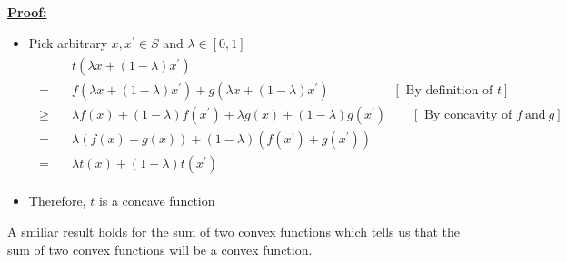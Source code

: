 \documentclass[12pt,a4paper]{article}
\begin{document}
 \underline{\textbf{Proof:}} 
 \begin{itemize}
    \item Pick arbitrary \(x, x^{\prime} \in S\) and \(\lambda \in[0,1]\)
    \begin{align*}
    \begin{array}{ll} 
    & t\left(\lambda x+(1-\lambda) x^{\prime}\right) \\
    =\quad & f\left(\lambda x+(1-\lambda) x^{\prime}\right)+g\left(\lambda x+(1-\lambda) x^{\prime}\right) \qquad \qquad \quad {[\text { By definition of } t]}\\
    \geq \quad & \lambda f(x)+(1-\lambda) f\left(x^{\prime}\right)+\lambda g(x)+(1-\lambda) g\left(x^{\prime}\right) \qquad {[\text { By concavity of } f \ \text{and} \ g]} \\
    = & \lambda(f(x)+g(x))+(1-\lambda)\left(f\left(x^{\prime}\right)+g\left(x^{\prime}\right)\right) \\
    = & \lambda t(x)+(1-\lambda) t\left(x^{\prime}\right)
    \end{array}
   \end{align*}
    
    \item Therefore, \(t\) is a concave function
 \end{itemize}

 A smiliar result holds for the sum of two convex functions which tells us that the sum of two convex functions will be a convex function.
\end{document}
